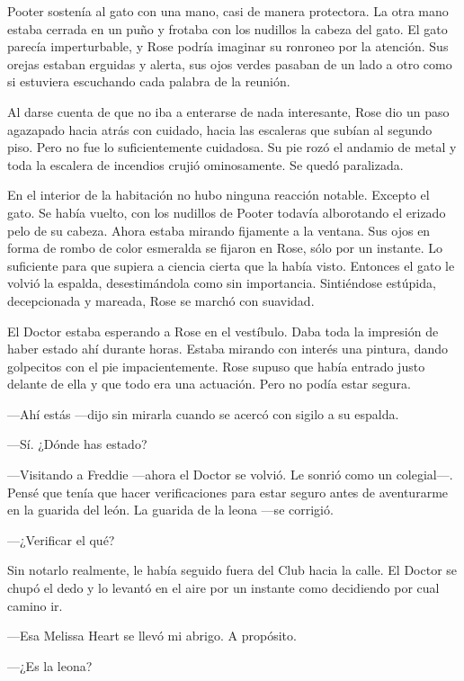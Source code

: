 {Pooter sostenía al gato con una mano, casi de manera protectora. La
	otra mano estaba cerrada en un puño y frotaba con los nudillos la cabeza
	del gato. El gato parecía imperturbable, y Rose podría imaginar su
	ronroneo por la atención. Sus orejas estaban erguidas y alerta, sus ojos
	verdes pasaban de un lado a otro como si estuviera escuchando cada
palabra de la reunión.}

{Al darse cuenta de que no iba a enterarse de nada interesante, Rose dio
	un paso agazapado hacia atrás con cuidado, hacia las escaleras que
	subían al segundo piso. Pero no fue lo suficientemente cuidadosa. Su pie
	rozó el andamio de metal y toda la escalera de incendios crujió
ominosamente. Se quedó paralizada.}

{En el interior de la habitación no hubo ninguna reacción notable.
	Excepto el gato. Se había vuelto, con los nudillos de Pooter todavía
	alborotando el erizado pelo de su cabeza. Ahora estaba mirando fijamente
	a la ventana. Sus ojos en forma de rombo de color esmeralda se fijaron
	en Rose, sólo por un instante. Lo suficiente para que supiera a ciencia
	cierta que la había visto. Entonces el gato le volvió la espalda,
	desestimándola como sin importancia. Sintiéndose estúpida, decepcionada
y mareada, Rose se marchó con suavidad.}

{El Doctor estaba esperando a Rose en el vestíbulo. Daba toda la
	impresión de haber estado ahí durante horas. Estaba mirando con interés
	una pintura, dando golpecitos con el pie impacientemente. Rose supuso
	que había entrado justo delante de ella y que todo era una actuación.
Pero no podía estar segura.}

{---Ahí estás ---dijo sin mirarla cuando se acercó con sigilo a su
espalda.}

{---Sí. ¿Dónde has estado?}

{---Visitando a Freddie ---ahora el Doctor se volvió. Le sonrió como un
	colegial---. Pensé que tenía que hacer verificaciones para estar seguro
	antes de aventurarme en la guarida del león. La guarida de la leona
---se corrigió.}

{---¿Verificar el qué?}

{Sin notarlo realmente, le había seguido fuera del Club hacia la calle.
	El Doctor se chupó el dedo y lo levantó en el aire por un instante como
decidiendo por cual camino ir.}

{---Esa Melissa Heart se llevó mi abrigo. A propósito.}

{---¿Es la leona?}

